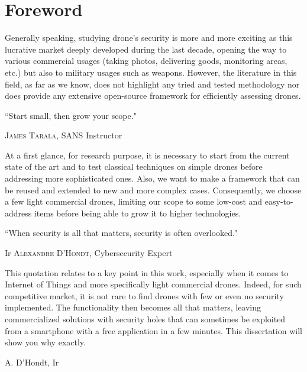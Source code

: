 \chapter*{Foreword}
\thispagestyle{empty}

\vspace{-2cm}
\vfill

\begin{center}
\begin{minipage}{15cm}
Generally speaking, studying drone's security is more and more exciting as this lucrative market deeply developed during the last decade, opening the way to various commercial usages (taking photos, delivering goods, monitoring areas, etc.) but also to military usages such as weapons. However, the literature in this field, as far as we know, does not highlight any tried and tested methodology nor does provide any extensive open-source framework for efficiently assessing drones.

\vspace{-1.2cm}
\epigraph{``Start small, then grow your scope."}{\normalfont \textsc{James Tarala}, SANS Instructor}
\vspace{-1.2cm}

At a first glance, for research purpose, it is necessary to start from the current state of the art and to test classical techniques on simple drones before addressing more sophisticated ones. Also, we want to make a framework that can be reused and extended to new and more complex cases. Consequently, we choose a few light commercial drones, limiting our scope to some low-cost and easy-to-address items before being able to grow it to higher technologies.

\epigraph{``When security is all that matters, \newline security is often overlooked."}{Ir \textsc{Alexandre D'Hondt}, Cybersecurity Expert}
\vspace{-1.2cm}
This quotation relates to a key point in this work, especially when it comes to Internet of Things and more specifically light commercial drones. Indeed, for such competitive market, it is not rare to find drones with few or even no security implemented. The functionality then becomes all that matters, leaving commercialized solutions with security holes that can sometimes be exploited from a smartphone with a free application in a few minutes. This dissertation will show you why exactly.

\vspace{1cm}
\begin{flushright}
\begin{minipage}{4cm}
\raggedleft
A. D'Hondt, Ir
\end{minipage}
\end{flushright}

\end{minipage}
\end{center}

\vfill
